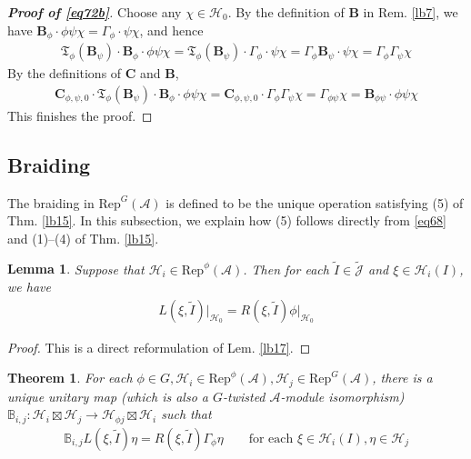 \documentclass[11pt,b5paper,notitlepage]{article}
\theoremstyle{definition}
\theoremstyle{plain}
\newtheorem{thm}[df]{Theorem}
\newtheorem{lm}[df]{Lemma}
\newcommand{\fk}{\mathfrak}
\newcommand{\wtd}{\widetilde}
\newcommand{\Rep}{\mathrm{Rep}}
\newcommand{\RepGA}{\mathrm{Rep}^G(\mathcal A)}
\newcommand{\Jtd}{\widetilde{\mathcal J}}
\newcommand{\mbb}{\mathbb}
\newcommand{\mbf}{\mathbf}
\newcommand{\MA}{\mathcal A}
\newcommand{\MH}{\mathcal H}
\numberwithin{equation}{section}
\begin{document}
\begin{appendices}
\begin{proof}[\textbf{Proof of \eqref{eq72b}}]
Choose any $\chi\in\MH_0$. By the definition of $\mbf B$ in Rem. \ref{lb7}, we have $\mbf B_\phi \cdot\phi\psi\chi=\Gamma_\phi\cdot \psi\chi$, and hence
\begin{align*}
\fk T_\phi(\mbf B_\psi)\cdot\mbf B_\phi\cdot \phi\psi\chi=\fk T_\phi(\mbf B_\psi)\cdot\Gamma_\phi\cdot\psi\chi=\Gamma_\phi\mbf B_\psi\cdot\psi \chi=\Gamma_\phi\Gamma_\psi\chi
\end{align*}
By the definitions of $\mbf C$ and $\mbf B$,
\begin{align*}
\mbf C_{\phi,\psi,0}\cdot\fk T_\phi(\mbf B_\psi)\cdot\mbf B_\phi\cdot \phi\psi\chi=\mbf C_{\phi,\psi,0}\cdot\Gamma_\phi\Gamma_\psi\chi=\Gamma_{\phi\psi}\chi=\mbf B_{\phi\psi}\cdot\phi\psi\chi
\end{align*}
This finishes the proof.
\end{proof}














\subsection{Braiding}



The braiding in $\RepGA$ is defined to be the unique operation satisfying (5) of Thm. \ref{lb15}. In this subsection, we explain how (5) follows directly from \eqref{eq68} and (1)--(4) of Thm. \ref{lb15}.

\begin{lm}\label{lb18}
Suppose that $\MH_i\in\Rep^\phi(\MA)$. Then for each $\wtd I\in\Jtd$ and $\xi\in\MH_i(I)$, we have
\begin{align*}
L(\xi,\wtd I)\big|_{\MH_0}=R(\xi,\wtd I)\phi\big|_{\MH_0}
\end{align*}
\end{lm}

\begin{proof}
This is a direct reformulation of Lem. \ref{lb17}.
\end{proof}

\begin{thm}\label{lb29}
For each $\phi\in G,\MH_i\in\Rep^\phi(\MA),\MH_j\in\RepGA$, there is a unique unitary map (which is also a $G$-twisted $\MA$-module isomorphism) $\mbb B_{i,j}:\MH_i\boxtimes\MH_j\rightarrow\MH_{\phi j}\boxtimes\MH_i$ such that
\begin{align*}
\mbb B_{i,j}L(\xi,\wtd I)\eta=R(\xi,\wtd I)\Gamma_\phi\eta\qquad\text{for each }\xi\in\MH_i(I),\eta\in\MH_j
\end{align*}
\end{thm}



\end{appendices}
\end{document}
